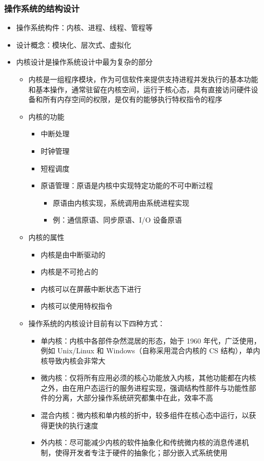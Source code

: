 \documentclass[cs4size,a4paper,10pt]{ctexart}
\begin{document}
		\subsubsection{操作系统的结构设计}
		\begin{itemize}
			\item 操作系统构件：内核、进程、线程、管程等
			\item 设计概念：模块化、层次式、虚拟化
			\item 内核设计是操作系统设计中最为复杂的部分
			\begin{itemize}
				\item 内核是一组程序模块，作为可信软件来提供支持进程并发执行的基本功能和基本操作，通常驻留在内核空间，运行于核心态，具有直接访问硬件设备和所有内存空间的权限，是仅有的能够执行特权指令的程序
				\item 内核的功能
				\begin{itemize}
					\item 中断处理
					\item 时钟管理
					\item 短程调度
					\item 原语管理：原语是内核中实现特定功能的不可中断过程
					\begin{itemize}
						\item 原语由内核实现，系统调用由系统进程实现
						\item 例：通信原语、同步原语、I/O 设备原语
					\end{itemize}
				\end{itemize}
				\item 内核的属性
				\begin{itemize}
					\item 内核是由中断驱动的
					\item 内核是不可抢占的
					\item 内核可以在屏蔽中断状态下进行
					\item 内核可以使用特权指令
				\end{itemize}
				\item 操作系统的内核设计目前有以下四种方式：
				\begin{itemize}
					\item 单内核：内核中各部件杂然混居的形态，始于 1960 年代，广泛使用，例如 Unix/Linux 和 Windows（自称采用混合内核的 CS 结构），单内核导致内核会非常大
					\item 微内核：仅将所有应用必须的核心功能放入内核，其他功能都在内核之外，由在用户态运行的服务进程实现，强调结构性部件与功能性部件的分离，大部分操作系统研究都集中在此，效率不高
					\item 混合内核：微内核和单内核的折中，较多组件在核心态中运行，以获得更快的执行速度
					\item 外内核：尽可能减少内核的软件抽象化和传统微内核的消息传递机制，使得开发者专注于硬件的抽象化；部分嵌入式系统使用
				\end{itemize}
			\end{itemize}
		\end{itemize}
\end{document}
